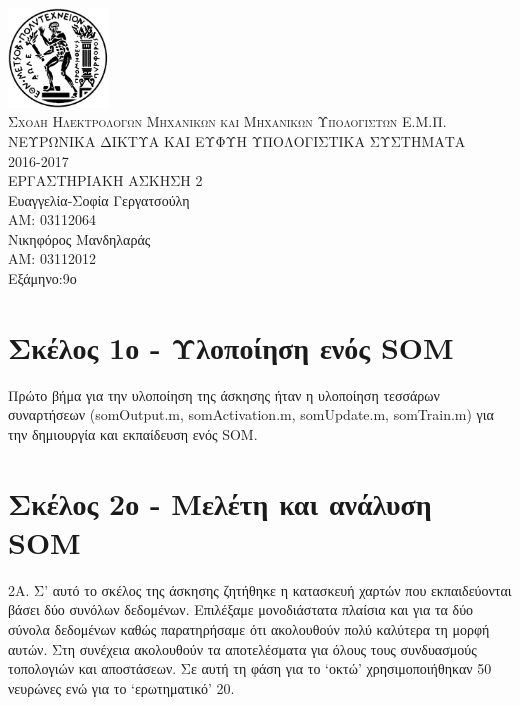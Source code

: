 \documentclass[12pt]{article}
\date{}
\begin{document}
\begin{titlepage}
\date{}
\begin{center}
\includegraphics[width=0.2\textwidth]{logo_ntua.jpg}\\

\textsc{\LARGE Σχολη Ηλεκτρολογων Μηχανικων και Μηχανικων Υπολογιστων Ε.Μ.Π.}\\[1.5cm]
\LARGE
ΝΕΥΡΩΝΙΚΑ ΔΙΚΤΥΑ ΚΑΙ ΕΥΦΥΗ ΥΠΟΛΟΓΙΣΤΙΚΑ ΣΥΣΤΗΜΑΤΑ\\
2016-2017\\
\vfill
ΕΡΓΑΣΤΗΡΙΑΚΗ ΑΣΚΗΣΗ 2\\
\vfill
Ευαγγελία-Σοφία Γεργατσούλη\\
ΑΜ: 03112064\\
Νικηφόρος Μανδηλαράς\\
ΑΜ: 03112012\\
Εξάμηνο:9ο\\
\vfill
\end{center}
\end{titlepage}
\newpage

\section*{Σκέλος 1ο - Υλοποίηση ενός SOM }
Πρώτο βήμα για την υλοποίηση της άσκησης ήταν η υλοποίηση τεσσάρων συναρτήσεων (somOutput.m, somActivation.m, somUpdate.m, somTrain.m) για την δημιουργία και εκπαίδευση ενός SOM.

\section*{Σκέλος 2ο - Μελέτη και ανάλυση SOM}
2Α. Σ' αυτό το σκέλος της άσκησης ζητήθηκε η κατασκευή χαρτών που εκπαιδεύονται βάσει δύο συνόλων δεδομένων. Επιλέξαμε μονοδιάστατα πλαίσια και για τα δύο σύνολα δεδομένων καθώς παρατηρήσαμε ότι ακολουθούν πολύ καλύτερα τη μορφή αυτών. Στη συνέχεια ακολουθούν τα αποτελέσματα για όλους τους συνδυασμούς τοπολογιών και αποστάσεων. Σε αυτή τη φάση για το   `οκτώ' χρησιμοποιήθηκαν 50 νευρώνες ενώ για το `ερωτηματικό' 20.
\end{document}
